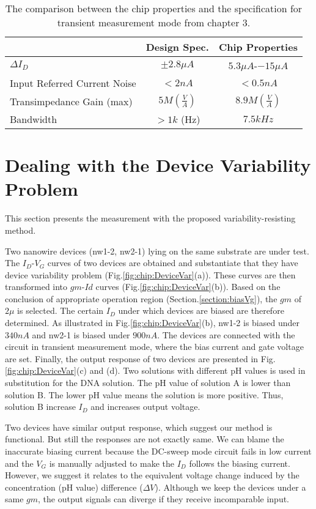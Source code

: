 \begin{table}[tbh!]
    {\fontfamily{}\fontsize{10}{14}\selectfont
    \centering
    \begin{tabular}{l|c|c}
        & Design Spec. & Chip Properties  \\
        \hline
        \hline
        $\Delta I_D$ & $\pm 2.8\mu A$ & $5.3\mu A$-$-15\mu A$\\
        \hline
        Input Referred Current Noise &$< 2n A$ & $< 0.5n A$\\
        \hline
        Transimpedance Gain (max) & $5 M(\frac{V}{A})$& $8.9 M (\frac{V}{A})$\\
        \hline
        Bandwidth &$> 1k$ (Hz) & $7.5k Hz$\\
    \end{tabular}
        \caption{The comparison between the chip properties and the specification for transient measurement mode from chapter 3.}
        \label{tb:chip:cvmR}
    }
\end{table}


\section{Dealing with the Device Variability Problem}
This section presents the measurement with the proposed variability-resisting method.

Two nanowire devices (nw1-2, nw2-1) lying on the same substrate are under test.
The $I_D$-$V_G$ curves of two devices are obtained and substantiate that they have device variability problem (Fig.\ref{fig:chip:DeviceVar}(a)).
These curves are then transformed into $gm$-$Id$ curves (Fig.\ref{fig:chip:DeviceVar}(b)).
Based on the conclusion of appropriate operation region (Section.\ref{section:biasVg}), the $gm$ of $2\mu$ is selected.
The certain $I_D$ under which devices are biased are therefore determined.
As illustrated in Fig.\ref{fig:chip:DeviceVar}(b), nw1-2 is biased under $340n A$ and nw2-1 is biased under $900n A$.
The devices are connected with the circuit in transient measurement mode, where the bias current and gate voltage are set.
Finally, the output response of two devices are presented in Fig.\ref{fig:chip:DeviceVar}(c) and (d).
Two solutions with different pH values is used in substitution for the DNA solution.
The pH value of solution A is lower than solution B.
The lower pH value means the solution is more positive.
Thus, solution B increase $I_D$ and increases output voltage.

Two devices have similar output response, which suggest our method is functional.
But still the responses are not exactly same.
We can blame the inaccurate biasing current because the DC-sweep mode circuit fails in low current and the $V_G$ is manually adjusted to make the $I_D$ follows the biasing current.
However, we suggest it relates to the equivalent voltage change induced by the concentration (pH value) difference ($\Delta V$).
Although we keep the devices under a same $gm$, the output signals can diverge if they receive incomparable input.



